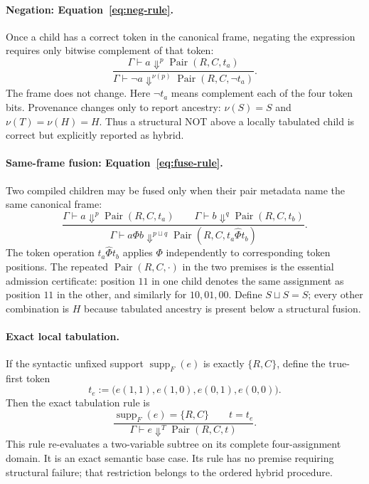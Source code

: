 \documentclass[10pt]{article}
\newcommand{\ptop}[1]{\widehat{#1}}
\newcommand{\Pair}{\operatorname{Pair}}
\newcommand{\supp}{\operatorname{supp}}
\theoremstyle{plain}
\theoremstyle{definition}
\theoremstyle{remark}
\begin{document}
\paragraph{Negation: Equation~\eqref{eq:neg-rule}.}
Once a child has a correct token in the canonical frame, negating the expression requires only bitwise complement of that token:
\begin{equation}
\frac{\Gamma\vdash a\Downarrow^p\Pair(R,C,t_a)}
{\Gamma\vdash \neg a\Downarrow^{\nu(p)}\Pair(R,C,\neg t_a)}.
\label{eq:neg-rule}
\end{equation}
The frame does not change. Here $\neg t_a$ means complement each of the four token bits. Provenance changes only to report ancestry: $\nu(S)=S$ and $\nu(T)=\nu(H)=H$. Thus a structural NOT above a locally tabulated child is correct but explicitly reported as hybrid.

\paragraph{Same-frame fusion: Equation~\eqref{eq:fuse-rule}.}
Two compiled children may be fused only when their pair metadata name the same canonical frame:
\begin{equation}
\frac{\Gamma\vdash a\Downarrow^p\Pair(R,C,t_a)
\qquad
\Gamma\vdash b\Downarrow^q\Pair(R,C,t_b)}
{\Gamma\vdash a\Phi b\Downarrow^{p\sqcup q}\Pair(R,C,t_a\ptop{\Phi}t_b)}.
\label{eq:fuse-rule}
\end{equation}
The token operation $t_a\ptop{\Phi}t_b$ applies $\Phi$ independently to corresponding token positions. The repeated $\Pair(R,C,\cdot)$ in the two premises is the essential admission certificate: position $11$ in one child denotes the same assignment as position $11$ in the other, and similarly for $10,01,00$. Define $S\sqcup S=S$; every other combination is $H$ because tabulated ancestry is present below a structural fusion.

\paragraph{Exact local tabulation.}
If the syntactic unfixed support $\supp_F(e)$ is exactly $\{R,C\}$, define the true-first token
\begin{equation}
 t_e:=\bigl(e(1,1),e(1,0),e(0,1),e(0,0)\bigr).
 \label{eq:tab-token}
\end{equation}
Then the exact tabulation rule is
\[
\frac{
  \supp_F(e)=\{R,C\}
  \qquad t=t_e
}{
  \Gamma\vdash e\Downarrow^T\Pair(R,C,t)
}.
\]
This rule re-evaluates a two-variable subtree on its complete four-assignment domain. It is an exact semantic base case. Its rule has no premise requiring structural failure; that restriction belongs to the ordered hybrid procedure.
\end{document}
